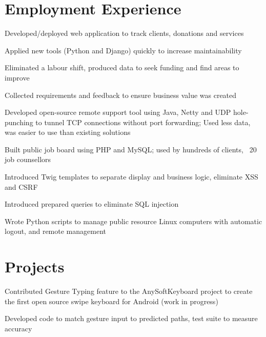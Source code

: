 \documentclass[]{deedy-resume-openfont}
\begin{document}
\begin{minipage}[t]{0.69\textwidth} 


\section{Employment Experience}
\sectionsep

\vspace{\topsep} %
\begin{tightemize}
\item Developed/deployed web application to track clients, donations and services
\item Applied new tools (Python and Django) quickly to increase maintainability
\item Eliminated a labour shift, produced data to seek funding and find areas to improve
\item Collected requirements and feedback to ensure business value was created
\end{tightemize}
\sectionsep

\begin{tightemize}
\item Developed open-source remote support tool using Java, Netty and UDP hole-punching to tunnel TCP connections without port forwarding; Used less data, was easier to use than existing solutions
\item Built public job board using PHP and MySQL; used by hundreds of clients, ~20 job counsellors
\item Introduced Twig templates to separate display and business logic, eliminate XSS and CSRF
\item Introduced prepared queries to eliminate SQL injection
\item Wrote Python scripts to manage public resource Linux computers with automatic logout, and remote management
\end{tightemize}
\sectionsep

\section{Projects}
\begin{tightemize}
\item Contributed Gesture Typing feature to the AnySoftKeyboard project to create the first open source swipe keyboard for Android (work in progress)
\item Developed code to match gesture input to predicted paths, test suite to measure accuracy
\end{tightemize}
\sectionsep


\end{minipage}
\end{document}
